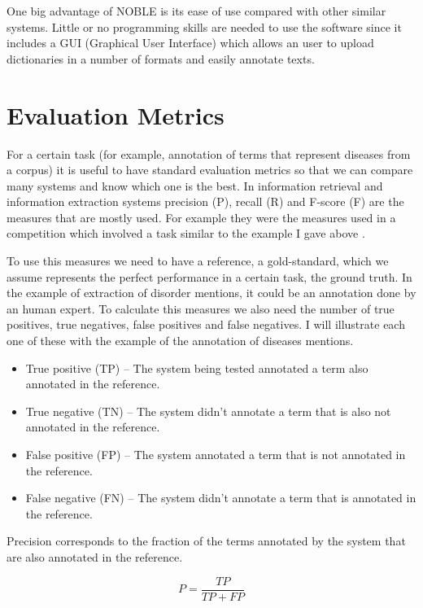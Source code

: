 One big advantage of NOBLE is its ease of use compared with other similar systems. Little or no programming skills are needed to use the software since it includes a GUI (Graphical User Interface) which allows an user to upload dictionaries in a number of formats and easily annotate texts. 

\section{Evaluation Metrics}

For a certain task (for example, annotation of terms that represent diseases from a corpus) it is useful to have standard evaluation metrics so that we can compare many systems and know which one is the best. In information retrieval and information extraction systems precision (P), recall (R) and F-score (F) are the measures that are mostly used. For example they were the measures used in a competition which involved a task similar to the example I gave above \citep{Elhadad2015}.

To use this measures we need to have a reference, a gold-standard, which we assume represents the perfect performance in a certain task, the ground truth. In the example of extraction of disorder mentions, it could be an annotation done by an human expert. To calculate this measures we also need the number of true positives, true negatives, false positives and false negatives. I will illustrate each one of these with the example of the annotation of diseases mentions.

\begin{itemize}
\item True positive (TP) – The system being tested annotated a term also annotated in the reference. 
\item True negative (TN) – The system didn't annotate a term that is also not annotated in the reference.
\item False positive (FP) – The system annotated a term that is not annotated in the reference. 
\item False negative (FN) – The system didn't annotate a term that is annotated in the reference. 
\end{itemize}

Precision corresponds to the fraction of the terms annotated by the system that are also annotated in the reference. 

\begin{equation}
P = \frac{TP}{TP+FP}
\end{equation}

